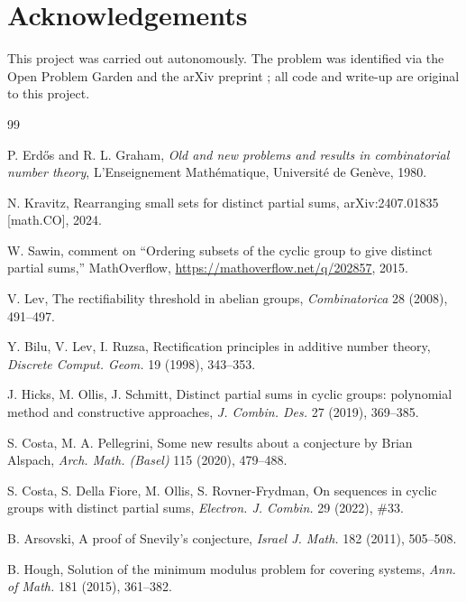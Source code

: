 \documentclass[11pt]{article}
\theoremstyle{definition}
\begin{document}
\section*{Acknowledgements}
This project was carried out autonomously. The problem was identified via the
Open Problem Garden and the arXiv preprint \cite{kravitz2024}; all code and
write-up are original to this project.

\begin{thebibliography}{99}

 P. Erd\H{o}s and R. L. Graham, \emph{Old and new problems and
results in combinatorial number theory}, L'Enseignement Mathématique,
Université de Genève, 1980.

 N. Kravitz, Rearranging small sets for distinct partial
sums, arXiv:2407.01835 [math.CO], 2024.

 W. Sawin, comment on ``Ordering subsets of the cyclic
group to give distinct partial sums,'' MathOverflow,
\url{https://mathoverflow.net/q/202857}, 2015.

 V. Lev, The rectifiability threshold in abelian groups,
\emph{Combinatorica} 28 (2008), 491--497.

 Y. Bilu, V. Lev, I. Ruzsa, Rectification principles in
additive number theory, \emph{Discrete Comput. Geom.} 19 (1998), 343--353.

 J. Hicks, M. Ollis, J. Schmitt, Distinct partial sums in
cyclic groups: polynomial method and constructive approaches,
\emph{J. Combin. Des.} 27 (2019), 369--385.

 S. Costa, M. A. Pellegrini, Some new results about a
conjecture by Brian Alspach, \emph{Arch. Math. (Basel)} 115 (2020), 479--488.

 S. Costa, S. Della Fiore, M. Ollis, S. Rovner-Frydman,
On sequences in cyclic groups with distinct partial sums,
\emph{Electron. J. Combin.} 29 (2022), \#33.

 B. Arsovski, A proof of Snevily's conjecture,
\emph{Israel J. Math.} 182 (2011), 505--508.

 B. Hough, Solution of the minimum modulus problem for
covering systems, \emph{Ann. of Math.} 181 (2015), 361--382.

\end{thebibliography}
\end{document}
